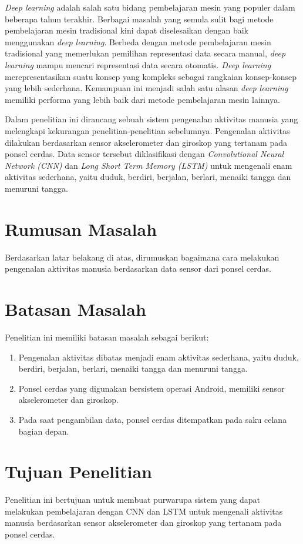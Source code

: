\textit{Deep learning} adalah salah satu bidang pembelajaran mesin yang populer dalam beberapa tahun terakhir. Berbagai masalah yang semula sulit bagi metode pembelajaran mesin tradisional kini dapat diselesaikan dengan baik menggunakan \textit{deep learning}. Berbeda dengan metode pembelajaran mesin tradisional yang memerlukan pemilihan representasi data secara manual, \textit{deep learning} mampu mencari representasi data secara otomatis. \textit{Deep learning} merepresentasikan suatu konsep yang kompleks sebagai rangkaian konsep-konsep yang lebih sederhana. Kemampuan ini menjadi salah satu alasan \textit{deep learning} memiliki performa yang lebih baik dari metode pembelajaran mesin lainnya.

Dalam penelitian ini dirancang sebuah sistem pengenalan aktivitas manusia yang melengkapi kekurangan penelitian-penelitian sebelumnya. Pengenalan aktivitas dilakukan berdasarkan sensor akselerometer dan giroskop yang tertanam pada ponsel cerdas. Data sensor tersebut diklasifikasi dengan \textit{Convolutional Neural Network (CNN)} dan \textit{Long Short Term Memory (LSTM)} untuk mengenali enam aktivitas sederhana, yaitu duduk, berdiri, berjalan, berlari, menaiki tangga dan menuruni tangga.

\section{Rumusan Masalah}
Berdasarkan latar belakang di atas, dirumuskan bagaimana cara melakukan pengenalan aktivitas manusia berdasarkan data sensor dari ponsel cerdas.

\section{Batasan Masalah}
Penelitian ini memiliki batasan masalah sebagai berikut:

\begin{enumerate}
    \item Pengenalan aktivitas dibatas menjadi enam aktivitas sederhana, yaitu duduk, berdiri, berjalan, berlari, menaiki tangga dan menuruni tangga.
    \item Ponsel cerdas yang digunakan bersistem operasi Android, memiliki sensor akselerometer dan giroskop.
    \item Pada saat pengambilan data, ponsel cerdas ditempatkan pada saku celana bagian depan.
\end{enumerate}

\section{Tujuan Penelitian}
Penelitian ini bertujuan untuk membuat purwarupa sistem yang dapat melakukan pembelajaran dengan CNN dan LSTM untuk mengenali aktivitas manusia berdasarkan sensor akselerometer dan giroskop yang tertanam pada ponsel cerdas.

